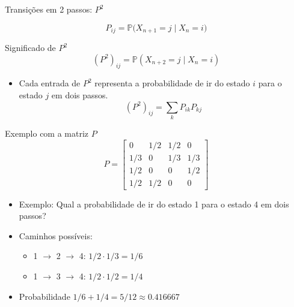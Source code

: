\documentclass{beamer}
\begin{document}
\begin{frame}{Transições em 2 passos: $P^2$}

  \vfill

   $$P_{ij} = \mathbb{P} \big( X_{n+1} = j \mid X_n=i \big)$$

   \vfill
   
  \begin{block}{Significado de $P^2$}\pause
    \[ (P^2)_{ij} = \mathbb{P}(X_{n+2} = j \mid X_n = i) \]
  \end{block}

   \vfill
  
  \begin{itemize}
  \item Cada entrada de $P^2$ representa a probabilidade de ir do estado $i$ para o estado $j$ em dois passos.
    \[ (P^2)_{ij} = \sum_k P_{ik} P_{kj} \]
  \end{itemize}
\end{frame}


\begin{frame}{Exemplo com a matriz $P$}
  \[ P = \begin{bmatrix}
      0 & {1}/{2} & {1}/{2} & 0 \\
      {1}/{3} & 0 & {1}/{3} & {1}/{3} \\
      {1}/{2} & 0 & 0 & {1}/{2} \\
      {1}/{2} & {1}/{2} & 0 & 0
    \end{bmatrix} \]
  \pause
  \begin{itemize}
  \item Exemplo: Qual a probabilidade de ir do estado 1 para o estado 4 em dois passos?
  \item Caminhos possíveis:
    \begin{itemize}
    \item 1 $\to$ 2 $\to$ 4: ${1}/{2} \cdot {1}/{3} = {1}/{6}$
    \item 1 $\to$ 3 $\to$ 4: ${1}/{2} \cdot {1}/{2} = {1}/{4}$
    \end{itemize}
  \item  Probabilidade ${1}/{6} + {1}/{4} = {5}/{12} \approx 0.416667$
  \end{itemize}
\end{frame}

\end{document}
